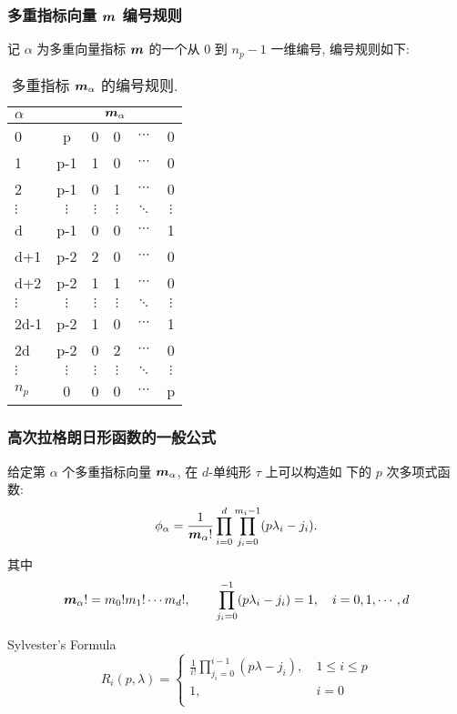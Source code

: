 \documentclass{beamer}
\numberwithin{subsection}{section}
\begin{document}
\begin{frame}
    \frametitle{多重指标向量 ${\boldsymbol m}$ 编号规则}
记 $\alpha$ 为多重向量指标 ${\boldsymbol m}$ 的一个从 0 到 $n_p-1$ 一维编号, 编号规则如下: 
\begin{table}[H]
    \tiny
    \centering
    \begin{tabular}{| l | c | c | c | c | c|}
    \hline
    $\alpha$ & \multicolumn{5}{c|}{${\boldsymbol m}_\alpha$} \\\hline
    0 & p   & 0 & 0 & $\cdots$ & 0 \\\hline
    1 & p-1 & 1 & 0 & $\cdots$ & 0 \\\hline
    2 & p-1 & 0 & 1 & $\cdots$ & 0 \\\hline
    $\vdots$ & $\vdots$ & $\vdots$ & $\vdots$ & $\ddots$ & $\vdots$ \\\hline
    d & p-1 & 0 & 0 & $\cdots$ & 1 \\\hline
    d+1 & p-2 & 2 & 0 & $\cdots$ & 0 \\\hline
    d+2 & p-2 & 1 & 1 & $\cdots$ & 0 \\\hline
    $\vdots$ & $\vdots$ & $\vdots$ & $\vdots$ & $\ddots$ & $\vdots$ \\\hline
    2d-1 & p-2 & 1 & 0 & $\cdots$ & 1 \\\hline
    2d & p-2 & 0 & 2 & $\cdots$ & 0 \\\hline
    $\vdots$ & $\vdots$ & $\vdots$ & $\vdots$ & $\ddots$ & $\vdots$ \\\hline
    $n_p$ & 0 & 0 & 0 & $\cdots$ & p \\
    \hline
    \end{tabular}
    \caption{多重指标 ${\boldsymbol m}_\alpha$ 的编号规则.}\label{tb:num}
\end{table}
\end{frame}

\begin{frame}
    \frametitle{高次拉格朗日形函数的一般公式}
给定第 $\alpha$ 个多重指标向量 ${\boldsymbol m}_\alpha$, 在 $d$-单纯形 $\tau$ 上可以构造如
下的 $p$ 次多项式函数:
\begin{equation}
    \phi_{\alpha} = \frac{1}{{\boldsymbol m}_\alpha!}\prod_{i=0}^{d}\prod_{j_i =
    0}^{m_i - 1} (p\lambda_i - j_i).
    \label{eq:phi0}
\end{equation}
其中
\begin{align*}
    {\boldsymbol m}_\alpha! = m_0!m_1!\cdots m_d!,\quad\quad \prod_{j_i=0}^{-1}(p\lambda_i -
    j_i) = 1,\quad i=0, 1,\cdots, d 
\end{align*}
\vspace{-0.5cm}
\begin{block}{Sylvester's Formula}
$$
R_i(p,\lambda)=
\begin{cases}
\frac{1}{i!}\prod_{j_i=0}^{i-1} (p\lambda-j_i),~& 1\leq i\leq p\\
1,& i=0\\
\end{cases}
$$
\end{block}
\end{frame}
\end{document}
